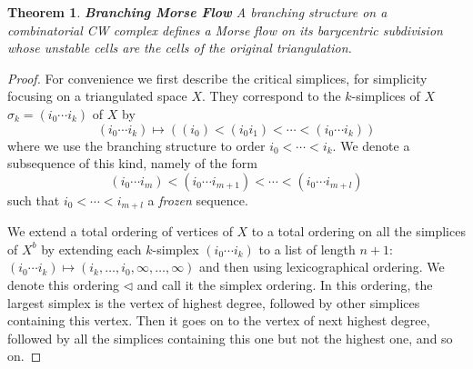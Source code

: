\documentclass{article}
\newtheorem{thm}{Theorem}
\theoremstyle{definition}
\begin{document}


\begin{thm} \textbf{Branching Morse Flow}
A branching structure on a combinatorial CW complex defines a Morse flow on its barycentric subdivision whose unstable cells are the cells of the original triangulation.
\end{thm}

\begin{proof}


For convenience we first describe the critical simplices, for simplicity focusing on a triangulated space $X$. They correspond to the $k$-simplices of $X$ $\sigma_k = (i_0 \cdots i_k)$ of $X$ by
\begin{equation}\label{e:critsimplices}
    (i_0 \cdots i_k) \mapsto ((i_0) < (i_0 i_1) < \cdots < (i_0 \cdots i_k))
\end{equation}
where we use the branching structure to order $i_0 < \cdots < i_k$. We denote a subsequence of this kind, namely of the form
\[(i_0 \cdots i_m) < (i_0 \cdots i_{m+1}) < \cdots < (i_0 \cdots i_{m+l})\]
such that $i_0 < \cdots < i_{m+l}$ a \emph{frozen} sequence.



We extend a total ordering of vertices of $X$ to a total ordering on all the simplices of $X^b$ by extending each $k$-simplex $(i_0 \cdots i_k)$ to a list of length $n+1$:
$(i_0 \cdots i_k) \mapsto (i_k, \ldots, i_0, \infty, \ldots, \infty)$
and then using lexicographical ordering. We denote this ordering $\lhd$ and call it the simplex ordering. In this ordering, the largest simplex is the vertex of highest degree, followed by other simplices containing this vertex. Then it goes on to the vertex of next highest degree, followed by all the simplices containing this one but not the highest one, and so on.


\end{proof}
\end{document}
